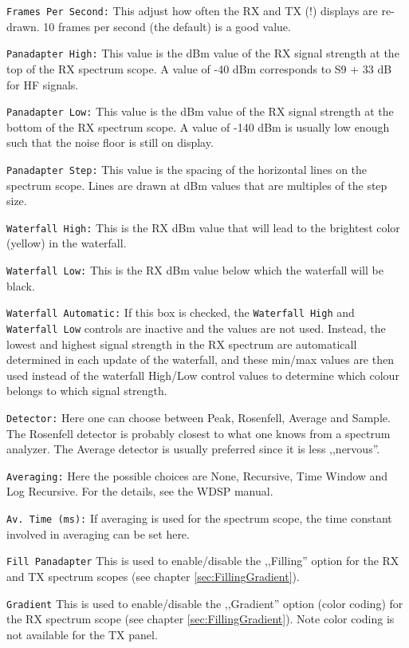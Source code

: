\documentclass[12pt]{book}
\def\rett#1{\texttt{\color{red}#1}}
\begin{document}
\rett{Frames Per Second:} This adjust how often the RX and TX (!) displays are re-drawn.
10 frames per second (the default) is a good value.

\rett{Panadapter High:} This value is the dBm value of the RX signal strength at the
top of the RX spectrum scope. A value of -40 dBm corresponds to S9 + 33 dB for HF
signals.

\rett{Panadapter Low:} This value is the dBm value of the RX signal strength at the
bottom of the RX spectrum scope. A value of -140 dBm is usually low enough such that
the noise floor is still on display.

\rett{Panadapter Step:} This value is the spacing of the horizontal lines on 
the spectrum scope. Lines are drawn at dBm values that are multiples of the step
size.

\rett{Waterfall High:} This is the RX dBm value that will lead to the brightest
color (yellow) in the waterfall.

\rett{Waterfall Low:} This is the RX dBm value below which the waterfall will be black.

\rett{Waterfall Automatic:} If this box is checked, the \rett{Waterfall High} and
\rett{Waterfall Low} controls are inactive and the values are not used. Instead, 
the lowest and highest signal strength in the RX spectrum are automaticall determined
in each update of the waterfall, and these min/max values
 are then used instead of the waterfall High/Low control values to determine which
 colour belongs to which signal strength.

\rett{Detector:} Here one can choose between Peak, Rosenfell, Average and Sample. The
Rosenfell detector is probably closest to what one knows from a spectrum analyzer.
The Average detector is usually preferred since it is less ,,nervous''.

\rett{Averaging:} Here the possible choices are None, Recursive, Time Window and
Log Recursive. For the details, see the WDSP manual.

\rett{Av. Time (ms):} If averaging is used for the spectrum scope, the time 
constant involved in averaging can be set here.

\rett{Fill Panadapter} This is used to enable/disable the ,,Filling'' option
for the RX and TX spectrum scopes (see chapter \ref{sec:FillingGradient}).

\rett{Gradient} This is used to enable/disable the ,,Gradient'' option
(color coding) for the RX spectrum scope (see chapter \ref{sec:FillingGradient}).
 Note color coding is not available for the TX panel.
 
\end{document}
